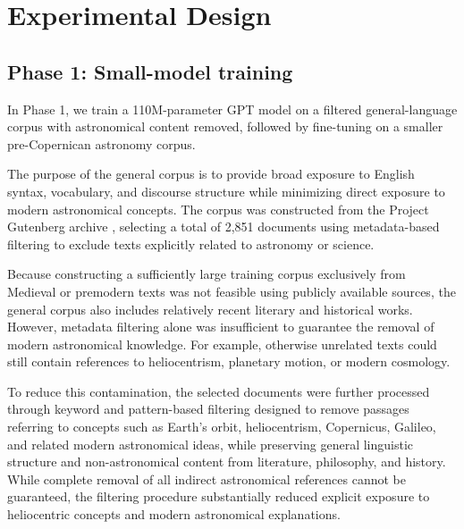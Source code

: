 \section{Experimental Design}\label{sec:exp_design}


\subsection{Phase 1: Small-model training}

In Phase 1, we train a 110M-parameter GPT model on a filtered general-language corpus with astronomical content removed, followed by fine-tuning on a smaller pre-Copernican astronomy corpus.

The purpose of the general corpus is to provide broad exposure to English syntax, vocabulary, and discourse structure while minimizing direct exposure to modern astronomical concepts. The corpus was constructed from the Project Gutenberg archive \cite{gutenberg}, selecting a total of 2,851 documents using metadata-based filtering to exclude texts explicitly related to astronomy or science.

Because constructing a sufficiently large training corpus exclusively from Medieval or premodern texts was not feasible using publicly available sources, the general corpus also includes relatively recent literary and historical works. However, metadata filtering alone was insufficient to guarantee the removal of modern astronomical knowledge. For example, otherwise unrelated texts could still contain references to heliocentrism, planetary motion, or modern cosmology.

To reduce this contamination, the selected documents were further processed through keyword and pattern-based filtering designed to remove passages referring to concepts such as Earth's orbit, heliocentrism, Copernicus, Galileo, and related modern astronomical ideas, while preserving general linguistic structure and non-astronomical content from literature, philosophy, and history. While complete removal of all indirect astronomical references cannot be guaranteed, the filtering procedure substantially reduced explicit exposure to heliocentric concepts and modern astronomical explanations.

